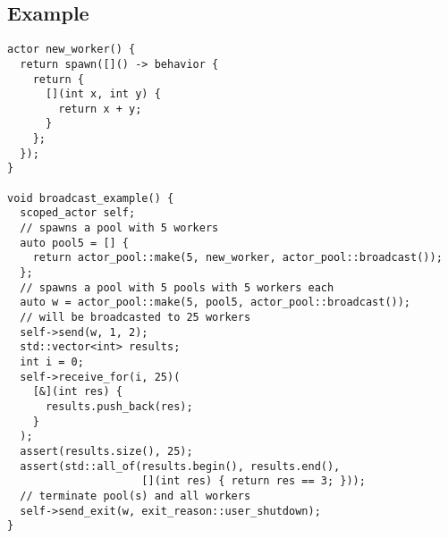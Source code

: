 \clearpage
\subsection{Example}

\begin{lstlisting}
actor new_worker() {
  return spawn([]() -> behavior {
    return {
      [](int x, int y) {
        return x + y;
      }
    };
  });
}

void broadcast_example() {
  scoped_actor self;
  // spawns a pool with 5 workers
  auto pool5 = [] {
    return actor_pool::make(5, new_worker, actor_pool::broadcast());
  };
  // spawns a pool with 5 pools with 5 workers each
  auto w = actor_pool::make(5, pool5, actor_pool::broadcast());
  // will be broadcasted to 25 workers
  self->send(w, 1, 2);
  std::vector<int> results;
  int i = 0;
  self->receive_for(i, 25)(
    [&](int res) {
      results.push_back(res);
    }
  );
  assert(results.size(), 25);
  assert(std::all_of(results.begin(), results.end(),
                     [](int res) { return res == 3; }));
  // terminate pool(s) and all workers
  self->send_exit(w, exit_reason::user_shutdown);
}
\end{lstlisting}
